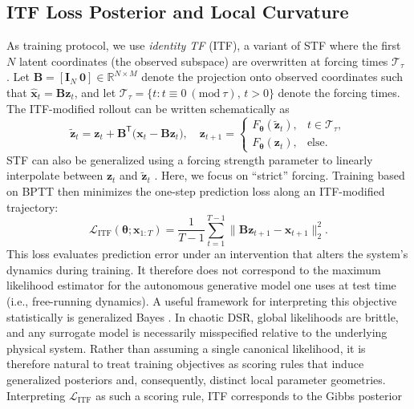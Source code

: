 \documentclass[twoside]{article}
\theoremstyle{plain}
\theoremstyle{definition}
\theoremstyle{remark}
\newcommand{\R}{\mathbb{R}}
\begin{document}
\subsection{ITF Loss Posterior and Local Curvature}
As training protocol, we use \emph{identity TF} (ITF), a variant of STF where the first $N$ latent coordinates (the observed subspace) are overwritten at forcing times $\mathcal T_\tau$ \citep{mikhaeil2022chaosrnn, brenner22dendritic}.
Let $\bm{B}=[\bm{I}_N\ \bm{0}]\in\R^{N\times M}$ denote the projection onto observed coordinates such that $\hat{\bm{x}}_t=\bm{B}\bm{z}_t$, and let $\mathcal T_\tau=\{t:t\equiv 0\ (\mathrm{mod}\ \tau),\,t>0\}$ denote the forcing times.
The ITF-modified rollout can be written schematically as
\begin{equation}
\label{eq:itf_rollout}
\tilde{\bm z}_t = \bm z_t + \bm B^{\mathsf T}\!\big(\bm x_t - \bm B\bm z_t\big),
\quad
\bm z_{t+1} =
\begin{cases}
F_{\bm\theta}(\tilde{\bm{z}}_t), & t\in\mathcal{T}_\tau,\\
F_{\bm\theta}(\bm{z}_t), & \text{else.}
\end{cases}
\end{equation}
STF can also be generalized using a forcing strength parameter to linearly interpolate between $\bm{z}_t$ and $\tilde{\bm{z}}_t$ \citep{hess2023gtf}. Here, we focus on ``strict'' forcing. Training based on BPTT then minimizes the one-step prediction loss along an ITF-modified trajectory:
\begin{equation}
\label{eq:tf_loss}
\mathcal{L}_{\mathrm{ITF}}(\bm\theta;\bm{x}_{1:T})
= \frac{1}{T-1}\sum_{t=1}^{T-1}\big\|\bm{B}\bm{z}_{t+1}-\bm{x}_{t+1}\big\|_2^2.
\end{equation}
This loss evaluates prediction error under an intervention that alters the system's dynamics during training. It therefore does not correspond to the maximum likelihood estimator for the autonomous generative model one uses at test time (i.e., free-running dynamics).
A useful framework for interpreting this objective statistically is generalized Bayes \citep{catoni2007pacbayes,bissiri2016generalbayes}. In chaotic DSR, global likelihoods are brittle, and any surrogate model is necessarily misspecified relative to the underlying physical system. Rather than assuming a single canonical likelihood, it is therefore natural to treat training objectives as scoring rules that induce generalized posteriors and, consequently, distinct local parameter geometries. Interpreting $\mathcal L_{\mathrm{ITF}}$ as such a scoring rule, ITF corresponds to the Gibbs posterior
\end{document}
